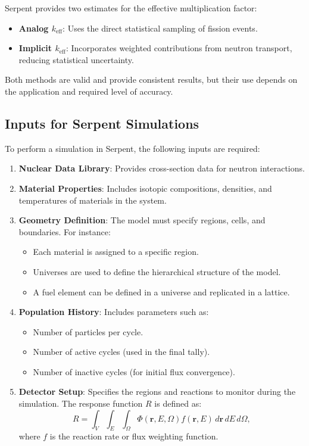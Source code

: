Serpent provides two estimates for the effective multiplication factor:
\begin{itemize}
    \item \textbf{Analog $k_{\text{eff}}$}: Uses the direct statistical sampling of fission events.
    \item \textbf{Implicit $k_{\text{eff}}$}: Incorporates weighted contributions from neutron transport, reducing statistical uncertainty.
\end{itemize}

Both methods are valid and provide consistent results, but their use depends on the application and required level of accuracy.

\subsection{Inputs for Serpent Simulations}

To perform a simulation in Serpent, the following inputs are required:
\begin{enumerate}
    \item \textbf{Nuclear Data Library}: Provides cross-section data for neutron interactions.
    \item \textbf{Material Properties}: Includes isotopic compositions, densities, and temperatures of materials in the system.
    \item \textbf{Geometry Definition}: The model must specify regions, cells, and boundaries. For instance:
    \begin{itemize}
        \item Each material is assigned to a specific region.
        \item Universes are used to define the hierarchical structure of the model.
        \item A fuel element can be defined in a universe and replicated in a lattice.
    \end{itemize}
    \item \textbf{Population History}: Includes parameters such as:
    \begin{itemize}
        \item Number of particles per cycle.
        \item Number of active cycles (used in the final tally).
        \item Number of inactive cycles (for initial flux convergence).
    \end{itemize}
    \item \textbf{Detector Setup}: Specifies the regions and reactions to monitor during the simulation. The response function $R$ is defined as:
    \[
    R = \int_V \int_E \int_\Omega \Phi(\mathbf{r}, E, \Omega) f(\mathbf{r}, E) \, d\mathbf{r} \, dE \, d\Omega,
    \]
    where $f$ is the reaction rate or flux weighting function.
\end{enumerate}

